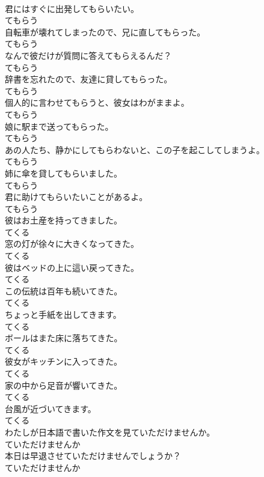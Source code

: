 \documentclass[8pt]{extreport}
\begin{document}
\begin{CJK}{UTF8}{min}
\\	君にはすぐに出発してもらいたい。	
\\	てもらう	
\\	自転車が壊れてしまったので、兄に直してもらった。	
\\	てもらう	
\\	なんで彼だけが質問に答えてもらえるんだ？	
\\	てもらう	
\\	辞書を忘れたので、友達に貸してもらった。	
\\	てもらう	
\\	個人的に言わせてもらうと、彼女はわがままよ。	
\\	てもらう	
\\	娘に駅まで送ってもらった。	
\\	てもらう	
\\	あの人たち、静かにしてもらわないと、この子を起こしてしまうよ。	
\\	てもらう	
\\	姉に傘を貸してもらいました。	
\\	てもらう	
\\	君に助けてもらいたいことがあるよ。	
\\	てもらう	
\\	彼はお土産を持ってきました。	
\\	てくる	
\\	窓の灯が徐々に大きくなってきた。	
\\	てくる	
\\	彼はベッドの上に這い戻ってきた。	
\\	てくる	
\\	この伝統は百年も続いてきた。	
\\	てくる	
\\	ちょっと手紙を出してきます。	
\\	てくる	
\\	ボールはまた床に落ちてきた。	
\\	てくる	
\\	彼女がキッチンに入ってきた。	
\\	てくる	
\\	家の中から足音が響いてきた。	
\\	てくる	
\\	台風が近づいてきます。	
\\	てくる	
\\	わたしが日本語で書いた作文を見ていただけませんか。	
\\	ていただけませんか	
\\	本日は早退させていただけませんでしょうか？	
\\	ていただけませんか	

\end{CJK}
\end{document}
